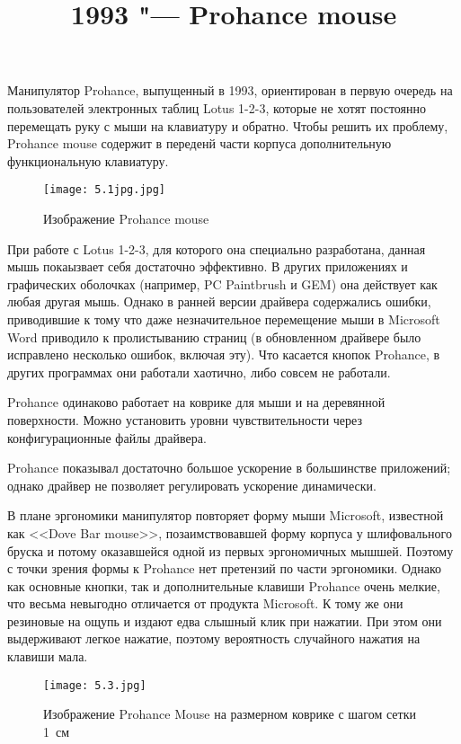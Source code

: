 \documentclass[11pt, a4paper]{article}
\begin{document}
\title{1993 "--- Prohance mouse}
\date{}
\maketitle

Манипулятор Prohance, выпущенный в 1993, ориентирован в первую очередь на пользователей электронных таблиц Lotus 1-2-3, которые не хотят постоянно перемещать руку с мыши на клавиатуру и обратно. Чтобы решить их проблему, 
    Prohance mouse содержит в переденй части корпуса дополнительную функциональную клавиатуру.
    
    \begin{figure}[h]
        \centering
    \texttt{[image: 5.1jpg.jpg]}
        \label{quad-niz}
        \caption{Изображение Prohance mouse}
    \end{figure}
    
    При работе с Lotus 1-2-3, для которого она специально разработана, данная мышь покаызвает себя достаточно эффективно. В других приложениях и графических оболочках (например, PC Paintbrush и GEM) она действует как любая другая мышь. Однако в ранней версии драйвера содержались ошибки, приводившие к тому что даже незначительное перемещение мыши в Microsoft Word приводило к пролистыванию страниц (в обновленном драйвере было исправлено несколько ошибок, включая эту). Что касается кнопок Prohance, в других программах они работали хаотично, либо совсем не работали.
    
    Prohance одинаково работает на коврике для мыши и на деревянной поверхности. Можно установить уровни чувствительности через конфигурационные файлы драйвера.
    
    Prohance показывал достаточно большое ускорение в большинстве приложений; однако драйвер не позволяет регулировать ускорение динамически.
    
    В плане эргономики манипулятор повторяет форму мыши Microsoft, известной как <<Dove Bar mouse>>, позаимствовавшей форму корпуса у шлифовального бруска и потому оказавшейся одной из первых эргономичных мышшей. Поэтому с точки зрения формы к Prohance нет претензий по части эргономики. Однако как основные кнопки, так и дополнительные клавиши Prohance очень мелкие, что весьма невыгодно отличается от продукта Microsoft. К тому же они резиновые на ощупь и издают едва слышный клик при нажатии. При этом они  выдерживают легкое нажатие, поэтому вероятность случайного нажатия на клавиши мала.
    \begin{figure}[h]
        \centering
    \texttt{[image: 5.3.jpg]}
        \label{quad-kov}
        \caption{Изображение Prohance Mouse на размерном коврике с шагом сетки 1~см}
    \end{figure}
    
\end{document}

